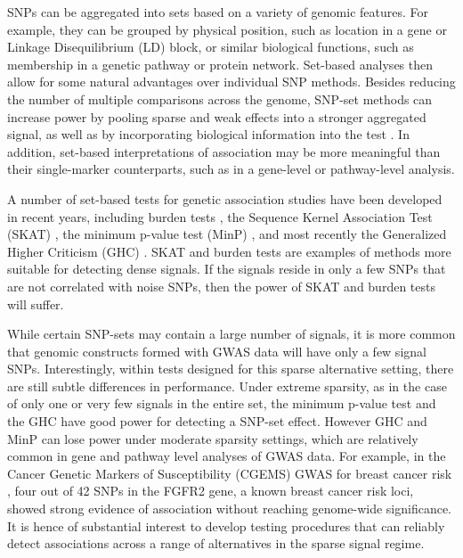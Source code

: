 \documentclass[12pt]{article}
\begin{document}
SNPs can be aggregated into sets based on a variety of genomic features.
For example, they can be grouped by physical position, such as location in a gene 
or Linkage Disequilibrium (LD) block, or similar biological functions, such as membership
in a genetic pathway or protein network.
Set-based analyses then allow for some natural advantages over individual SNP methods. 
Besides reducing the number of multiple comparisons across the genome, SNP-set 
methods can increase power by pooling sparse and weak effects into a stronger aggregated 
signal, as well as by incorporating biological information into the test \citep{SKAT}. 
In addition, set-based interpretations of association may be more meaningful than their 
single-marker counterparts, such as in a gene-level or pathway-level analysis.
 

A number of set-based tests for genetic association studies have been developed in 
recent years, including burden tests \citep{LiLeal}, the Sequence Kernel Association 
Test (SKAT) \citep{SKAT}, the minimum p-value test (MinP) \citep{minP}, and most 
recently the  Generalized Higher Criticism (GHC) \citep*{GHC}. 
SKAT and burden tests are examples of methods more suitable for detecting dense signals.
If the signals reside in only a few SNPs that are not correlated with noise SNPs, then
the power of SKAT and burden tests will suffer.

While certain SNP-sets may contain a large number of signals, it is more common that 
genomic constructs formed with GWAS data will have only a few signal SNPs.
Interestingly, within tests designed for this sparse alternative setting, there are still subtle differences 
in performance.  
Under extreme sparsity, as in the case of only one or very few signals in the entire set, the 
minimum p-value test and the GHC have good power for detecting a SNP-set effect. 
However GHC and MinP can lose power under moderate sparsity settings, which are 
relatively common in gene and pathway level analyses of GWAS data.
For example, in the Cancer Genetic Markers of Susceptibility (CGEMS) GWAS for 
breast cancer risk \citep{CGEMS}, four out of 42 SNPs in the FGFR2 gene, a known 
breast cancer risk loci, showed strong evidence of association without reaching 
genome-wide significance.
It is hence of substantial interest to develop testing procedures that can reliably detect 
associations across a range of alternatives in the sparse signal regime.
\end{document}
